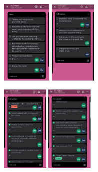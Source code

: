 \documentclass[conference]{IEEEtran}
\begin{document}
\begin{figure}[H]
\centering
\includegraphics[width=0.215\textwidth]{1.png}
\includegraphics[width=0.2\textwidth]{2.png}
\end{figure}
\vspace{-0.7cm}
\begin{figure}[H]
\centering
\includegraphics[width=0.2\textwidth]{3.png}
\includegraphics[width=0.2\textwidth]{4.png}
\end{figure}

\vspace{-0.7cm}
\end{document}
